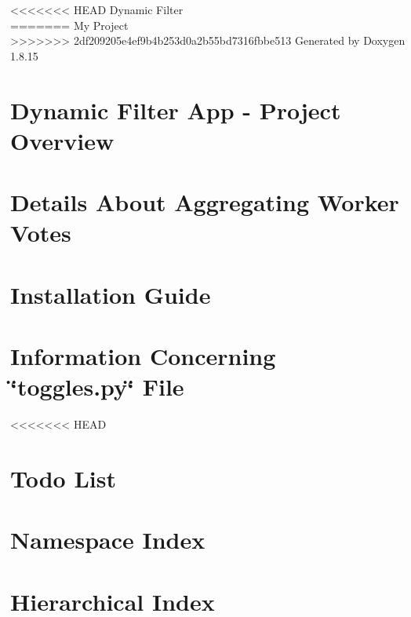 \let\mypdfximage\pdfximage\def\pdfximage{\immediate\mypdfximage}\documentclass[twoside]{book}
\newcommand{\+}{\discretionary{\mbox{\scriptsize$\hookleftarrow$}}{}{}}
\newcommand{\clearemptydoublepage}{%
  \newpage{\pagestyle{empty}\cleardoublepage}%
}
\begin{document}
\hypersetup{pageanchor=false,
             bookmarksnumbered=true,
             pdfencoding=unicode
            }
\begin{titlepage}
\vspace*{7cm}
\begin{center}%
<<<<<<< HEAD
{\Large Dynamic Filter }\\
=======
{\Large My Project }\\
>>>>>>> 2df209205e4ef9b4b253d0a2b55bd7316fbbe513
\vspace*{1cm}
{\large Generated by Doxygen 1.8.15}\\
\end{center}
\end{titlepage}
\clearemptydoublepage
{}
\tableofcontents
\clearemptydoublepage
{}
\hypersetup{pageanchor=true}

\chapter{Dynamic Filter App -\/ Project Overview}
\label{index}\hypertarget{index}{}
\chapter{Details About Aggregating Worker Votes}
\label{con_info}

\chapter{Installation Guide}
\label{install_info}

\chapter{Information Concerning \char`\"{}toggles.\+py\char`\"{} File}
\label{toggles}

<<<<<<< HEAD
\chapter{Todo List}
\label{todo}

\chapter{Namespace Index}

\chapter{Hierarchical Index}

\end{document}
